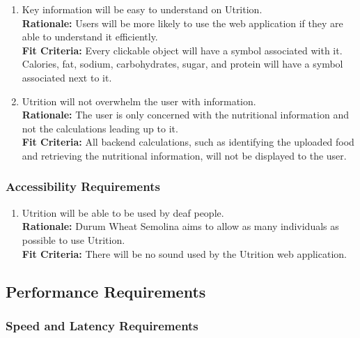 \documentclass[12pt]{article}
\begin{document}
\begin{enumerate}[start=4,label={UH\arabic*.}]
	\item Key information will be easy to understand on Utrition.\\
	\textbf{Rationale:} Users will be more likely to use the web application if they are able to understand it efficiently.\\
	\textbf{Fit Criteria:} Every clickable object will have a symbol associated with it. Calories, fat, sodium, carbohydrates, sugar, and protein will have a symbol associated next to it.
	\item Utrition will not overwhelm the user with information.\\
	\textbf{Rationale:} The user is only concerned with the nutritional information and not the calculations leading up to it.\\
	\textbf{Fit Criteria:} All backend calculations, such as identifying the uploaded food and retrieving the nutritional information, will not be displayed to the user.
\end{enumerate}

\subsubsection{Accessibility Requirements}

\begin{enumerate}[{UH}6. ] 
	\item Utrition will be able to be used by deaf people.\\
	\textbf{Rationale:} Durum Wheat Semolina aims to allow as many individuals as possible to use Utrition.\\
	\textbf{Fit Criteria:} There will be no sound used by the Utrition web application. 
\end{enumerate}

\subsection{Performance Requirements}

\subsubsection{Speed and Latency Requirements}
\end{document}
